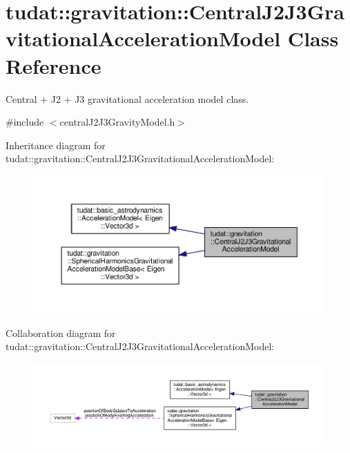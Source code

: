 \hypertarget{classtudat_1_1gravitation_1_1CentralJ2J3GravitationalAccelerationModel}{}\section{tudat\+:\+:gravitation\+:\+:Central\+J2\+J3\+Gravitational\+Acceleration\+Model Class Reference}
\label{classtudat_1_1gravitation_1_1CentralJ2J3GravitationalAccelerationModel}


Central + J2 + J3 gravitational acceleration model class.  




{\ttfamily \#include $<$central\+J2\+J3\+Gravity\+Model.\+h$>$}



Inheritance diagram for tudat\+:\+:gravitation\+:\+:Central\+J2\+J3\+Gravitational\+Acceleration\+Model\+:
\nopagebreak
\begin{figure}[H]
\begin{center}
\leavevmode
\includegraphics[width=350pt]{classtudat_1_1gravitation_1_1CentralJ2J3GravitationalAccelerationModel__inherit__graph}
\end{center}
\end{figure}


Collaboration diagram for tudat\+:\+:gravitation\+:\+:Central\+J2\+J3\+Gravitational\+Acceleration\+Model\+:
\nopagebreak
\begin{figure}[H]
\begin{center}
\leavevmode
\includegraphics[width=350pt]{classtudat_1_1gravitation_1_1CentralJ2J3GravitationalAccelerationModel__coll__graph}
\end{center}
\end{figure}

